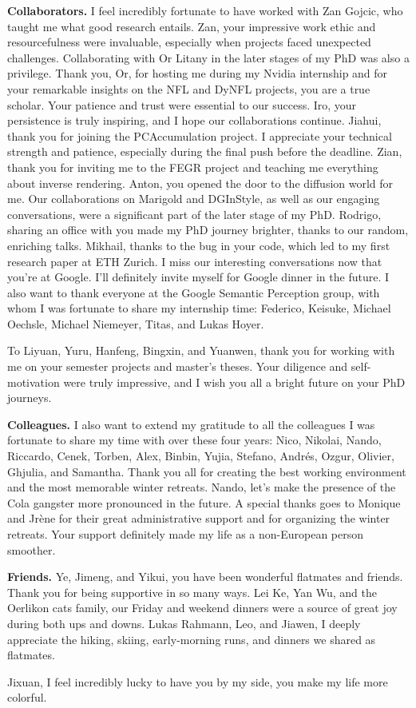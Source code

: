 \noindent
\textbf{Collaborators.}
I feel incredibly fortunate to have worked with Zan Gojcic, who taught me what good research entails. Zan, your impressive work ethic and resourcefulness were invaluable, especially when projects faced unexpected challenges. Collaborating with Or Litany in the later stages of my PhD was also a privilege. Thank you, Or, for hosting me during my Nvidia internship and for your remarkable insights on the NFL and DyNFL projects, you are a true scholar. Your patience and trust were essential to our success. Iro, your persistence is truly inspiring, and I hope our collaborations continue. Jiahui, thank you for joining the PCAccumulation project. I appreciate your technical strength and patience, especially during the final push before the deadline. Zian, thank you for inviting me to the FEGR project and teaching me everything about inverse rendering. Anton, you opened the door to the diffusion world for me. Our collaborations on Marigold and DGInStyle, as well as our engaging conversations, were a significant part of the later stage of my PhD. Rodrigo, sharing an office with you made my PhD journey brighter, thanks to our random, enriching talks. Mikhail, thanks to the bug in your code, which led to my first research paper at ETH Zurich. I miss our interesting conversations now that you're at Google. I'll definitely invite myself for Google dinner in the future. I also want to thank everyone at the Google Semantic Perception group, with whom I was fortunate to share my internship time: Federico, Keisuke, Michael Oechsle, Michael Niemeyer, Titas, and Lukas Hoyer.

To Liyuan, Yuru, Hanfeng, Bingxin, and Yuanwen, thank you for working with me on your semester projects and master's theses. Your diligence and self-motivation were truly impressive, and I wish you all a bright future on your PhD journeys.

\noindent
\textbf{Colleagues.}
I also want to extend my gratitude to all the colleagues I was fortunate to share my time with over these four years: Nico, Nikolai, Nando, Riccardo, Cenek, Torben, Alex, Binbin, Yujia, Stefano, Andrés, Ozgur, Olivier, Ghjulia, and Samantha. Thank you all for creating the best working environment and the most memorable winter retreats. Nando, let's make the presence of the Cola gangster more pronounced in the future. A special thanks goes to Monique and Jrène for their great administrative support and for organizing the winter retreats. Your support definitely made my life as a non-European person smoother. 

\noindent
\textbf{Friends.}
Ye, Jimeng, and Yikui, you have been wonderful flatmates and friends. Thank you for being supportive in so many ways. Lei Ke, Yan Wu, and the Oerlikon cats family, our Friday and weekend dinners were a source of great joy during both ups and downs. Lukas Rahmann, Leo, and Jiawen, I deeply appreciate the hiking, skiing, early-morning runs, and dinners we shared as flatmates.

Jixuan, I feel incredibly lucky to have you by my side, you make my life more colorful.